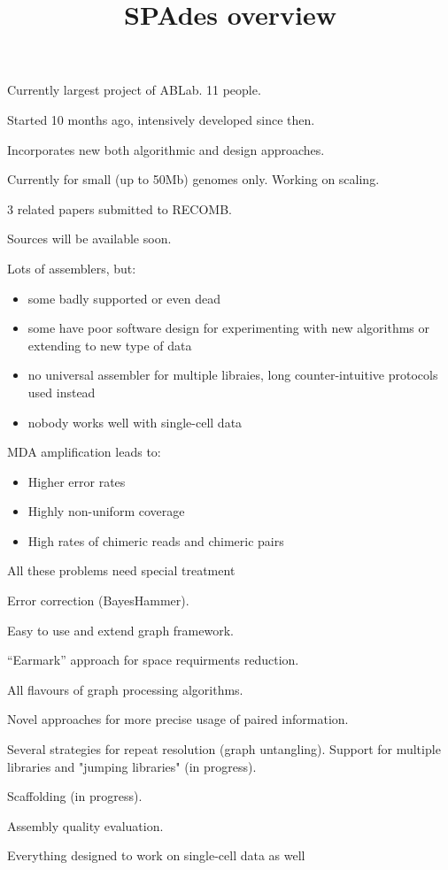 
\title{SPAdes overview}

\begin{frame}
\titlepage
\end{frame}


 {
\item Currently largest project of ABLab. 11 people.
\item Started 10 months ago, intensively developed since then.
\item Incorporates new both algorithmic and design approaches.
\item Currently for small (up to 50Mb) genomes only. Working on scaling.
\item 3 related papers submitted to RECOMB.
\item Sources will be available soon.
}

 {
Lots of assemblers, but:
\begin{itemize}
\item some badly supported or even dead %
\item some have poor software design for experimenting with new algorithms or extending to new type of data
\item no universal assembler for multiple libraies, long counter-intuitive protocols used instead
\item nobody works well with single-cell data
\end{itemize}
}

 {
MDA amplification leads to:
\begin{itemize}
\item Higher error rates
\item Highly non-uniform coverage
\item High rates of chimeric reads and chimeric pairs
\end{itemize}

\pause
All these problems need special treatment%
}

 {
\item Error correction (BayesHammer).
\item Easy to use and extend graph framework.
\item ``Earmark'' approach for space requirments reduction.
\item All flavours of graph processing algorithms.
\item Novel approaches for more precise usage of paired information.
\item Several strategies for repeat resolution (graph untangling). Support for multiple libraries and "jumping libraries" (in progress).
\item Scaffolding (in progress).
\item Assembly quality evaluation.
\item Everything designed to work on single-cell data as well 
}


